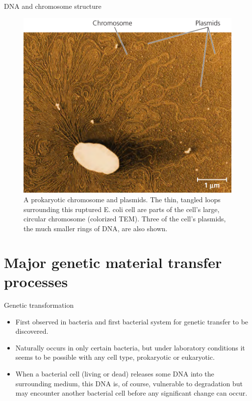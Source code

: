 \documentclass[ignorenonframetext,aspectratio=169]{beamer}
\providecommand{\tightlist}{%
  \setlength{\itemsep}{0pt}\setlength{\parskip}{0pt}}
\begin{document}
\begin{frame}{DNA and chromosome structure}
\protect\hypertarget{dna-and-chromosome-structure}{}

\begin{figure}
\includegraphics[width=0.38\linewidth]{./../images/prokaryotic_chr_plasmid} \caption{A prokaryotic chromosome and plasmids. The thin, tangled loops surrounding this ruptured E. coli cell are parts of the cell’s large, circular chromosome (colorized TEM). Three of the cell’s plasmids, the much smaller rings of DNA, are also shown.}\label{fig:prokaryotic-dna}
\end{figure}

\end{frame}

\hypertarget{major-genetic-material-transfer-processes}{%
\section{Major genetic material transfer
processes}\label{major-genetic-material-transfer-processes}}

\begin{frame}{Genetic transformation}
\protect\hypertarget{genetic-transformation}{}

\begin{itemize}
\tightlist
\item
  First observed in bacteria and first bacterial system for genetic
  transfer to be discovered.
\item
  Naturally occurs in only certain bacteria, but under laboratory
  conditions it seems to be possible with any cell type, prokaryotic or
  eukaryotic.
\item
  When a bacterial cell (living or dead) releases some DNA into the
  surrounding medium, this DNA is, of course, vulnerable to degradation
  but may encounter another bacterial cell before any significant change
  can occur.
\end{itemize}

\end{frame}
\end{document}
